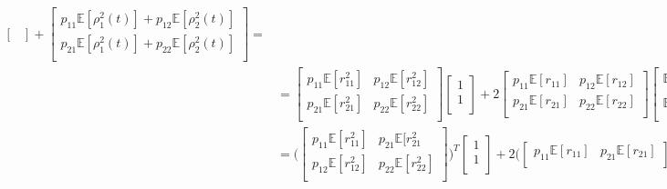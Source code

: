 \documentclass[\main/main.tex]{subfiles}
\begin{document}
\begin{equation}
\begin{split}
\begin{bmatrix}
 \end{bmatrix}
 +
 \begin{bmatrix} 
 p_{11}\mathds{E}[\rho_1^2(t)] + p_{12}\mathds{E}[\rho_2^2(t)] \\
 p_{21}\mathds{E}[\rho_1^2(t)] +  p_{22}\mathds{E}[\rho_2^2(t)]\\
 \end{bmatrix} =\\
  &= 
 \begin{bmatrix} 
 p_{11}\mathds{E}[r^2_{11}] & p_{12}\mathds{E}[r^2_{12}]\\
 p_{21}\mathds{E}[r^2_{21}] &  p_{22} \mathds{E}[r^2_{22}]\\
 \end{bmatrix}
  \begin{bmatrix}
 1\\
 1\\
 \end{bmatrix}
 + 2
 \begin{bmatrix}
 p_{11}\mathds{E}[r_{11}] & p_{12}\mathds{E}[r_{12}]\\
 p_{21}\mathds{E}[r_{21}] & p_{22}\mathds{E}[r_{22}]\\
 \end{bmatrix}
 \begin{bmatrix}
 \mathds{E}[\rho_1^1(t)]\\
 \mathds{E}[\rho_2^1(t)]\\
 \end{bmatrix}
 +
 \begin{bmatrix} 
 p_{11}& p_{12} \\
  p_{21}& p_{22} \\
 \end{bmatrix}
 \begin{bmatrix}
 \mathds{E}[\rho_2^1(t)]\\
 \mathds{E}[\rho_2^2(t)]
 \end{bmatrix}
 =
 \\
 &= \Bigg( \begin{bmatrix} 
 p_{11}\mathds{E}[r^2_{11}] & p_{21}\mathds{E}[r^2_{21}\\
 p_{12}\mathds{E}[r^2_{12}]&  p_{22} \mathds{E}[r^2_{22}]\\
 \end{bmatrix}
  \Bigg) ^T
  \begin{bmatrix}
 1\\
 1\\
 \end{bmatrix}
 + 2\Bigg( 
 \begin{bmatrix}
 p_{11}\mathds{E}[r_{11}] & p_{21}\mathds{E}[r_{21}]\\

\end{bmatrix}
\end{split}
\end{equation}
\end{document}
